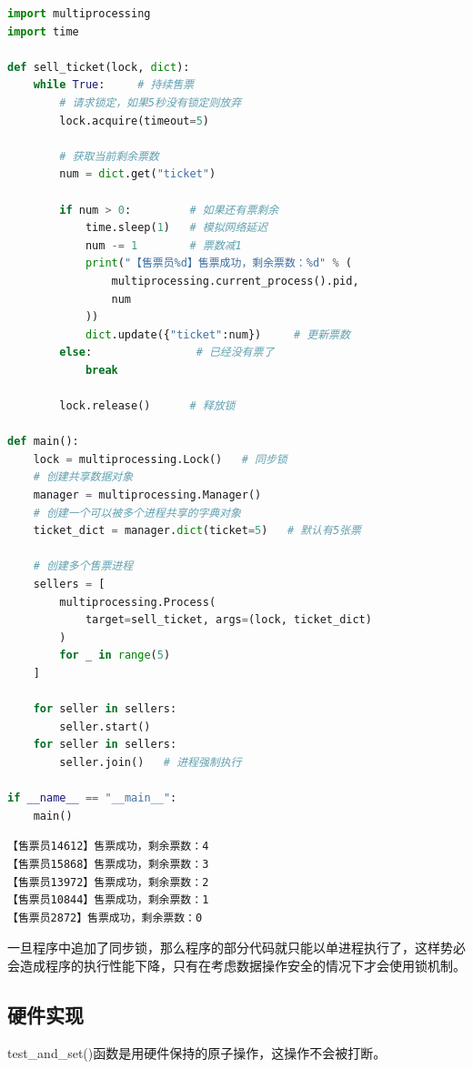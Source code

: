 \begin{lstlisting}[language=Python]
import multiprocessing
import time

def sell_ticket(lock, dict):
	while True:     # 持续售票
		# 请求锁定，如果5秒没有锁定则放弃
		lock.acquire(timeout=5)
		
		# 获取当前剩余票数
		num = dict.get("ticket")
		
		if num > 0:         # 如果还有票剩余
			time.sleep(1)   # 模拟网络延迟
			num -= 1        # 票数减1
			print("【售票员%d】售票成功，剩余票数：%d" % (
				multiprocessing.current_process().pid,
				num
			))
			dict.update({"ticket":num})     # 更新票数
		else:                # 已经没有票了
			break
		
		lock.release()      # 释放锁

def main():
	lock = multiprocessing.Lock()   # 同步锁
	# 创建共享数据对象
	manager = multiprocessing.Manager()
	# 创建一个可以被多个进程共享的字典对象
	ticket_dict = manager.dict(ticket=5)   # 默认有5张票

	# 创建多个售票进程
	sellers = [
		multiprocessing.Process(
			target=sell_ticket, args=(lock, ticket_dict)
		) 
		for _ in range(5)
	]

	for seller in sellers:
		seller.start()
	for seller in sellers:
		seller.join()   # 进程强制执行

if __name__ == "__main__":
	main()
\end{lstlisting}

\begin{tcolorbox}
    \begin{verbatim}
【售票员14612】售票成功，剩余票数：4
【售票员15868】售票成功，剩余票数：3
【售票员13972】售票成功，剩余票数：2
【售票员10844】售票成功，剩余票数：1
【售票员2872】售票成功，剩余票数：0
	\end{verbatim}
\end{tcolorbox}

一旦程序中追加了同步锁，那么程序的部分代码就只能以单进程执行了，这样势必会造成程序的执行性能下降，只有在考虑数据操作安全的情况下才会使用锁机制。\\

\subsection{硬件实现}

test\_and\_set()函数是用硬件保持的原子操作，这操作不会被打断。

\vspace{-0.5cm}

